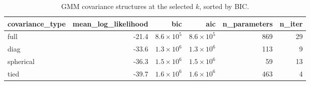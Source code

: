 \begin{table}[htbp]
\centering
\begin{tabular}{lrrrrr}
\toprule
covariance\_type & mean\_log\_likelihood & bic & aic & n\_parameters & n\_iter \\
\midrule
full & -21.4 & $8.6\times 10^{5}$ & $8.6\times 10^{5}$ & 869 & 29 \\
diag & -33.6 & $1.3\times 10^{6}$ & $1.3\times 10^{6}$ & 113 & 9 \\
spherical & -36.3 & $1.5\times 10^{6}$ & $1.5\times 10^{6}$ & 59 & 13 \\
tied & -39.7 & $1.6\times 10^{6}$ & $1.6\times 10^{6}$ & 463 & 4 \\
\bottomrule
\end{tabular}
\caption{GMM covariance structures at the selected $k$, sorted by BIC.}
\label{tab:gmm-cov}
\end{table}
